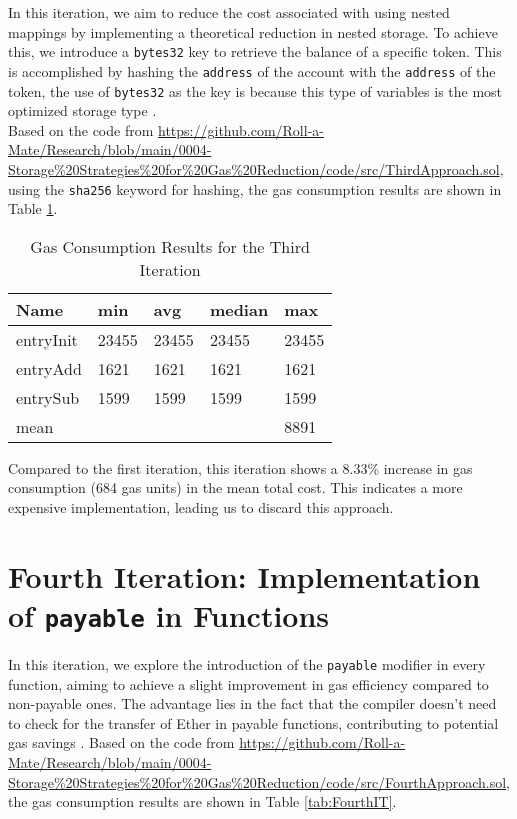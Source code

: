 \documentclass[fleqn,10pt]{olplainarticle}
\begin{document}
In this iteration, we aim to reduce the cost associated with using nested mappings by implementing a theoretical reduction in nested storage. To achieve this, we introduce a \texttt{bytes32} key to retrieve the balance of a specific token. This is accomplished by hashing the \texttt{address} of the account with the \texttt{address} of the token, the use of \texttt{bytes32} as the key is because this type of variables is the most optimized storage type \cite{malanii_solidity_2023,riady_how_2021}.\\
Based on the code from
\url{https://github.com/Roll-a-Mate/Research/blob/main/0004-Storage%20Strategies%20for%20Gas%20Reduction/code/src/ThirdApproach.sol}, using the \texttt{sha256} keyword for hashing, the gas consumption results are shown in Table \ref{tab:ThirdIT}.

\begin{table}[H]
	\centering
	\begin{tabular}{|l|l|l|l|l|}
		\hline
		Name       & min    & avg   & median &  max   \\ \hline
		entryInit  & 23455  & 23455 & 23455  &  23455 \\ \hline
		entryAdd   & 1621  	& 1621 	& 1621   &  1621   \\ \hline
		entrySub   & 1599  	& 1599 	& 1599   &  1599   \\ \hline
		mean       &\cellcolor{black}&\cellcolor{black}&\cellcolor{black}&8891\\ \hline
	\end{tabular}
	\caption{Gas Consumption Results for the Third Iteration}
	\label{tab:ThirdIT}
\end{table}

Compared to the first iteration, this iteration shows a 8.33\% increase in gas consumption (684 gas units) in the mean total cost. This indicates a more expensive implementation, leading us to discard this approach.

\section{Fourth Iteration: Implementation of \texttt{payable} in Functions}

In this iteration, we explore the introduction of the \texttt{payable} modifier in every function, aiming to achieve a slight improvement in gas efficiency compared to non-payable ones. The advantage lies in the fact that the compiler doesn't need to check for the transfer of Ether in payable functions, contributing to potential gas savings \cite{malanii_solidity_2023}.
Based on the code from \url{https://github.com/Roll-a-Mate/Research/blob/main/0004-Storage%20Strategies%20for%20Gas%20Reduction/code/src/FourthApproach.sol}, the gas consumption results are shown in Table \ref{tab:FourthIT}.
\end{document}

